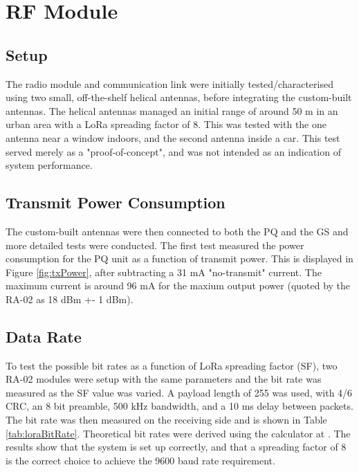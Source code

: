 \graphicspath{{./figures}}

\section{RF Module}

\subsection{Setup}
The radio module and communication link were initially tested/characterised using two small, off-the-shelf helical antennas, before integrating the custom-built antennas. The helical antennas managed an initial range of around 50 m in an urban area with a LoRa spreading factor of 8. This was tested with the one antenna near a window indoors, and the second antenna inside a car. This test served merely as a "proof-of-concept", and was not intended as an indication of system performance.

\subsection{Transmit Power Consumption}
The custom-built antennas were then connected to both the PQ and the GS and more detailed tests were conducted. The first test measured the power consumption for the PQ unit as a function of transmit power. This is displayed in Figure \ref{fig:txPower}, after subtracting a 31 mA "no-transmit" current. The maximum current is around 96 mA for the maxium output power (quoted by the RA-02 as 18 dBm +- 1 dBm).

\subsection{Data Rate}
To test the possible bit rates as a function of LoRa spreading factor (SF), two RA-02 modules were setup with the same parameters and the bit rate was measured as the SF value was varied. A payload length of 255 was used, with 4/6 CRC, an 8 bit preamble, 500 kHz bandwidth, and a 10 ms delay between packets. The bit rate was then measured on the receiving side and is shown in Table \ref{tab:loraBitRate}. Theoretical bit rates were derived using the calculator at \cite{site-loraBitRateCalculator}. The results show that the system is set up correctly, and that a spreading factor of 8 is the correct choice to achieve the 9600 baud rate requirement.

